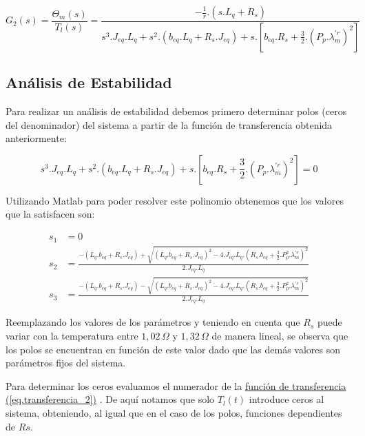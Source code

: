 \documentclass{article}
\begin{document}
\begin{equation}\label{eq.transferencia_2}
    G_{2}(s) = \frac{\Theta_{m}(s)}{T_{l}(s)} = \frac{- \frac{1}{r}.(s.L_{q}+R_{s})}{s^3.J_{eq}.L_{q} + s^2.(b_{eq}.L_{q} +  R_{s}.J_{eq}) + s.[b_{eq}.R_{s}+\frac{3}{2}.(P_{p}.\lambda_{m}^{\prime r})^2]}
\end{equation}


\subsection{Análisis de Estabilidad}

Para realizar un análisis de estabilidad debemos primero determinar polos (ceros del denominador) del 
sistema a partir de la función de transferencia obtenida anteriormente:

\begin{equation}
    s^3.J_{eq}.L_{q} + s^2.(b_{eq}.L_{q} +  R_{s}.J_{eq}) + s.[b_{eq}.R_{s}+\frac{3}{2}.(P_{p}.\lambda_{m}^{\prime r})^2] = 0
\end{equation}

Utilizando Matlab para poder resolver este polinomio obtenemos que los valores que la satisfacen son:

\begin{align*}
    s_{1} &= 0\\
    s_{2} &= \frac{-(L_q.b_{eq} + R_s.J_{eq}) + \sqrt{(L_q.b_{eq} + R_s.J_{eq})^2 - 4.J_{eq}.L_q.(R_s.b_{eq} + \frac{3}{2}.P_p^2.\lambda_{m}^{\prime r})^2}}{2.J_{eq}.L_q}\\
    s_{3} &= \frac{-(L_q.b_{eq} + R_s.J_{eq}) - \sqrt{(L_q.b_{eq} + R_s.J_{eq})^2 - 4.J_{eq}.L_q.(R_s.b_{eq} + \frac{3}{2}.P_p^2.\lambda_{m}^{\prime r})^2}}{2.J_{eq}.L_q}
\end{align*}

Reemplazando los valores de los parámetros y teniendo en cuenta que $R_s$ puede variar con la temperatura entre 
$1,02\, \Omega$ y $1,32\, \Omega$ de manera lineal, se observa que los polos se encuentran en 
función de este valor dado que las demás valores son parámetros fijos del sistema.

Para determinar los ceros evaluamos  el numerador de la
\hyperref[eq.transferencia_2]{función de transferencia (\ref*{eq.transferencia_2})}
. De aquí notamos que solo $T_l(t)$ introduce ceros al sistema, obteniendo, al igual que en el caso 
de los polos, funciones dependientes de $Rs$.
\end{document}
